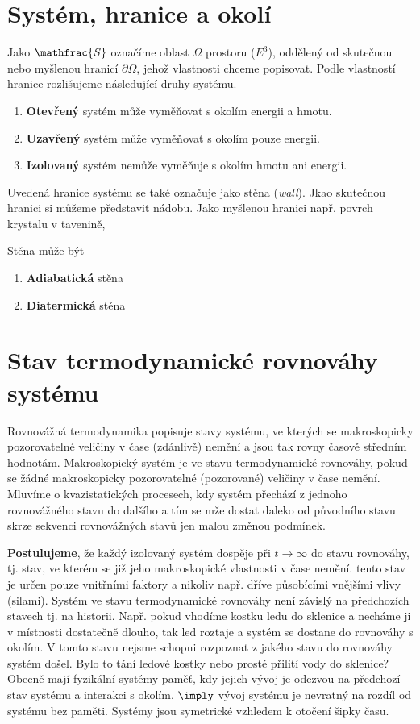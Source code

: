 \section{Systém, hranice a okolí}

Jako  $\mathfrac{S}$ označíme oblast $\Omega$ prostoru ($E^3$), oddělený od  skutečnou nebo myšlenou hranicí $\partial \Omega$, jehož vlastnosti chceme popisovat. Podle vlastností hranice rozlišujeme následující druhy systému.

\begin{enumerate}
    \item \textbf{Otevřený} systém může vyměňovat s okolím energii a hmotu.
    \item \textbf{Uzavřený} systém  může vyměňovat s okolím pouze energii.
    \item \textbf{Izolovaný} systém nemůže vyměňuje s okolím hmotu ani energii.
\end{enumerate}

Uvedená hranice systému se také označuje jako stěna (\textit{wall}). Jkao skutečnou hranici si můžeme představit nádobu. Jako myšlenou hranici např. povrch krystalu v tavenině,

Stěna může být 
\begin{enumerate}
    \item \textbf{Adiabatická} stěna
    \item \textbf{Diatermická} stěna
\end{enumerate}


\section{Stav termodynamické rovnováhy systému} 

Rovnovážná termodynamika popisuje stavy systému, ve kterých se makroskopicky pozorovatelné veličiny v čase (zdánlivě) nemění a jsou tak rovny časově středním hodnotám. Makroskopický systém je ve stavu termodynamické rovnováhy, pokud se žádné makroskopicky pozorovatelné (pozorované) veličiny v čase nemění. Mluvíme o kvazistatických procesech, kdy systém přechází z jednoho rovnovážného stavu do dalšího  a tím se mže dostat daleko od původního stavu skrze sekvenci rovnovážných stavů jen malou změnou podmínek.

\textbf{Postulujeme}, že každý izolovaný systém dospěje při $t \to \infty$ do stavu rovnováhy, tj. stav, ve kterém se již jeho makroskopické vlastnosti v čase nemění. tento stav je určen pouze vnitřními faktory a nikoliv např. dříve působícími vnějšími vlivy (silami). Systém ve stavu termodynamické rovnováhy není závislý na předchozích stavech tj. na historii. Např. pokud vhodíme kostku ledu do sklenice a necháme ji v místnosti dostatečně dlouho, tak led roztaje a systém se dostane do rovnováhy s okolím. V tomto stavu nejsme schopni rozpoznat z jakého stavu do rovnováhy systém došel. Bylo to tání ledové kostky nebo prosté přilití vody do sklenice? Obecně mají fyzikální systémy paměť, kdy jejich vývoj je odezvou na předchozí stav systému a interakci s okolím. $\imply$ vývoj systému je nevratný na rozdíl od systému bez paměti.  Systémy jsou symetrické vzhledem k otočení šipky času.

